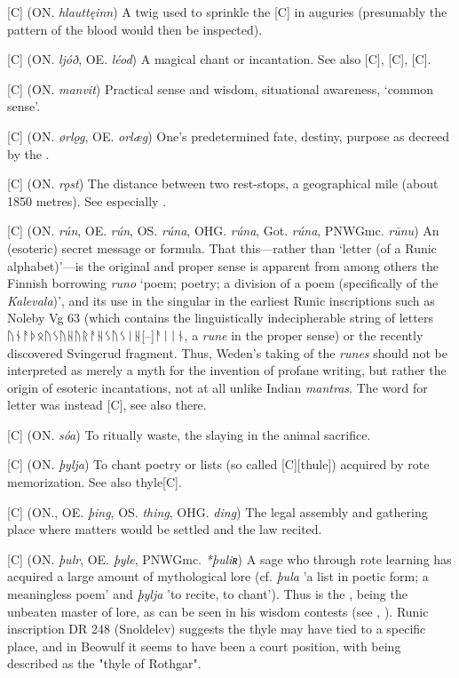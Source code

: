 \begin{itemize}
[C] (ON. \emph{hlauttęinn})
  A twig used to sprinkle the [C] in auguries (presumably the pattern of the blood would then be inspected).

[C] (ON. \emph{ljóð}, OE. \emph{léod})
  A magical chant or incantation. See also [C], [C], [C].

[C] (ON. \emph{manvit})
  Practical sense and wisdom, situational awareness, ‘common sense’.

[C] (ON. \emph{ørlǫg}, OE. \emph{orlæg})
  One’s predetermined fate, destiny, purpose as decreed by the .

[C] (ON. \emph{rǫst})
  The distance between two rest-stops, a geographical mile (about 1850 metres). See especially \CV.

[C] (ON. \emph{rún}, OE. \emph{rún}, OS. \emph{rúna}, OHG. \emph{rúna}, Got. \emph{rúna}, PNWGmc. \emph{rūnu})
  An (esoteric) secret message or formula. That this—rather than ‘letter (of a Runic alphabet)’—is the original and proper sense is apparent from among others the Finnish borrowing \emph{runo} ‘poem; poetry; a division of a poem (specifically of the \emph{Kalevala})’, and its use in the singular in the earliest Runic inscriptions such as Noleby Vg 63 (which contains the linguistically indecipherable string of letters {ᚢᚾᚨᚦᛟᚢᛊᚢᚺᚢᚱᚨᚺᛊᚢᛊᛁᚺ[--]ᚨᛁᛁᚾ}, a \emph{rune} in the proper sense) or the recently discovered Svingerud fragment. Thus, Weden’s taking of the \emph{runes} should not be interpreted as merely a myth for the invention of profane writing, but rather the origin of esoteric incantations, not at all unlike Indian \emph{mantras}.
  The word for letter was instead [C], see also there.

[C] (ON. \emph{sóa})
  To ritually waste, the slaying in the animal sacrifice.

[C] (ON. \emph{þylja})
  To chant poetry or lists (so called [C][thule]) acquired by rote memorization. See also {thyle}[C].

[C] (ON., OE. \emph{þing}, OS. \emph{thing}, OHG. \emph{ding})
  The legal assembly and gathering place where matters would be settled and the law recited.

[C] (ON. \emph{þulr}, OE. \emph{þyle}, PNWGmc. \emph{*þuliʀ})
  A sage who through rote learning has acquired a large amount of mythological lore (cf. \emph{þula} 'a list in poetic form; a meaningless poem' and \emph{þylja} 'to recite, to chant'). Thus  is the , being the unbeaten master of lore, as can be seen in his wisdom contests (see \Allvismal, \Vafthrudnismal). Runic inscription DR 248 (Snoldelev) suggests the thyle may have tied to a specific place, and in Beowulf it seems to have been a court position, with  being described as the "thyle of Rothgar".


\end{itemize}
